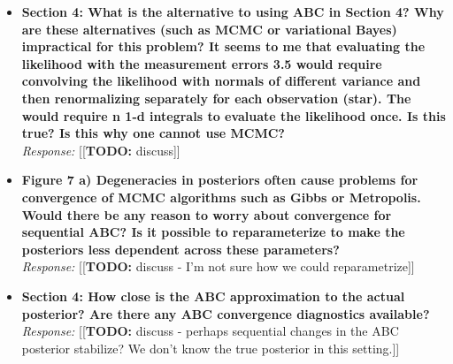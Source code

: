 \documentclass[11pt, oneside]{article}   	%
\newcommand{\todo}[1]{{\color{red}[[\textbf{TODO: }#1]]}}
\begin{document}
\begin{itemize}
\item  {\bf Section 4: What is the alternative to using ABC in Section 4? Why are these alternatives (such as MCMC or variational Bayes) impractical for this problem? It seems to me that evaluating the likelihood with the measurement errors 3.5 would require convolving the likelihood with normals of different variance and then renormalizing separately for each observation (star). The would require n 1-d integrals to evaluate the likelihood once. Is this true? Is this why one cannot use MCMC?}\\
\noindent \emph{Response:} \todo{discuss}
\bigskip

\item  {\bf Figure 7 a) Degeneracies in posteriors often cause problems for convergence of MCMC algorithms such as Gibbs or Metropolis. Would there be any reason to worry about convergence for sequential ABC? Is it possible to reparameterize to make the posteriors less dependent across these parameters?} \\
\noindent \emph{Response:} \todo{discuss - I'm not sure how we could reparametrize}
\bigskip

\item  {\bf  Section 4: How close is the ABC approximation to the actual posterior? Are there any ABC convergence diagnostics available?} \\
\noindent \emph{Response:} \todo{discuss - perhaps sequential changes in the ABC posterior stabilize?  We don't know the true posterior in this setting.}
\bigskip
\end{itemize}


\\
\end{document}
